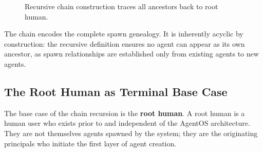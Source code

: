 \begin{figure}[tb]
\centering
{}
\caption{Recursive chain construction traces all ancestors back to root human.}
\label{fig:chain-construction}
\end{figure}

The chain encodes the complete spawn genealogy. It is inherently acyclic by construction: the recursive definition ensures no agent can appear as its own ancestor, as spawn relationships are established only from existing agents to new agents.

\subsection{The Root Human as Terminal Base Case}

The base case of the chain recursion is the \textbf{root human}. A root human is a human user who exists prior to and independent of the AgentOS architecture. They are not themselves agents spawned by the system; they are the originating principals who initiate the first layer of agent creation.

